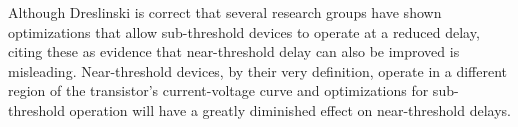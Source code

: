 Although Dreslinski is correct that several research groups have shown optimizations that allow sub-threshold devices to operate at a reduced delay\cite{Dreslinski:2010ez}, citing these as evidence that near-threshold delay can also be improved is misleading. Near-threshold devices, by their very definition, operate in a different region of the transistor's current-voltage curve and optimizations for sub-threshold operation will have a greatly diminished effect on near-threshold delays.